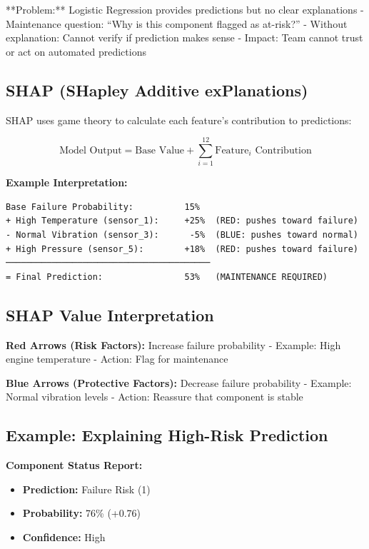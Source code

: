 \documentclass[11pt,a4paper]{article}
\begin{document}
**Problem:** Logistic Regression provides predictions but no clear explanations
- Maintenance question: ``Why is this component flagged as at-risk?''
- Without explanation: Cannot verify if prediction makes sense
- Impact: Team cannot trust or act on automated predictions

\subsection{SHAP (SHapley Additive exPlanations)}

SHAP uses game theory to calculate each feature's contribution to predictions:

\[
\text{Model Output} = \text{Base Value} + \sum_{i=1}^{12} \text{Feature}_i \text{ Contribution}
\]

\textbf{Example Interpretation:}
\begin{verbatim}
Base Failure Probability:          15%
+ High Temperature (sensor_1):     +25%  (RED: pushes toward failure)
- Normal Vibration (sensor_3):      -5%  (BLUE: pushes toward normal)
+ High Pressure (sensor_5):        +18%  (RED: pushes toward failure)
────────────────────────────────────────
= Final Prediction:                53%   (MAINTENANCE REQUIRED)
\end{verbatim}

\subsection{SHAP Value Interpretation}

\textbf{Red Arrows (Risk Factors):} Increase failure probability
- Example: High engine temperature
- Action: Flag for maintenance

\textbf{Blue Arrows (Protective Factors):} Decrease failure probability
- Example: Normal vibration levels
- Action: Reassure that component is stable

\subsection{Example: Explaining High-Risk Prediction}

\textbf{Component Status Report:}
\begin{itemize}
    \item \textbf{Prediction:} Failure Risk (1)
    \item \textbf{Probability:} 76\% (+0.76)
    \item \textbf{Confidence:} High
\end{itemize}
\end{document}

